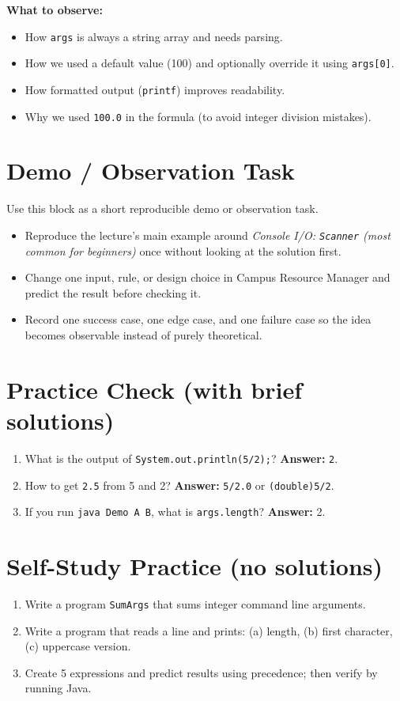 \documentclass[11pt]{article}
\begin{document}
\textbf{What to observe:}
\begin{itemize}
  \item How \texttt{args} is always a string array and needs parsing.
  \item How we used a default value (100) and optionally override it using \texttt{args[0]}.
  \item How formatted output (\texttt{printf}) improves readability.
  \item Why we used \texttt{100.0} in the formula (to avoid integer division mistakes).
\end{itemize}
\notesources{\OOPSUnitISources}

\section{Demo / Observation Task}
Use this block as a short reproducible demo or observation task.
\begin{itemize}
  \item Reproduce the lecture's main example around \textit{Console I/O: \texttt{Scanner} (most common for beginners)} once without looking at the solution first.
  \item Change one input, rule, or design choice in Campus Resource Manager and predict the result before checking it.
  \item Record one success case, one edge case, and one failure case so the idea becomes observable instead of purely theoretical.
\end{itemize}
\notesources{\OOPSUnitISources}

\section{Practice Check (with brief solutions)}
\begin{enumerate}
  \item What is the output of \texttt{System.out.println(5/2);}?\; \textbf{Answer:} \texttt{2}.
  \item How to get \texttt{2.5} from 5 and 2?\; \textbf{Answer:} \texttt{5/2.0} or \texttt{(double)5/2}.
  \item If you run \texttt{java Demo A B}, what is \texttt{args.length}?\; \textbf{Answer:} 2.
\end{enumerate}

\section{Self-Study Practice (no solutions)}
\begin{enumerate}
  \item Write a program \texttt{SumArgs} that sums integer command line arguments.
  \item Write a program that reads a line and prints: (a) length, (b) first character, (c) uppercase version.
  \item Create 5 expressions and predict results using precedence; then verify by running Java.
\end{enumerate}
\end{document}
